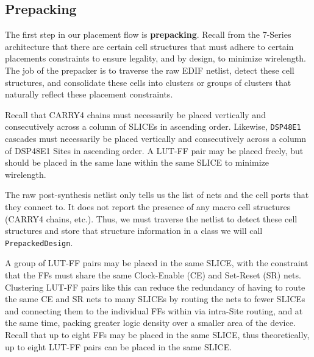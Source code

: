 \documentclass{article}
\begin{document}
    \begin{multicols}{2}

    \subsection{Prepacking}
        \label{subsec:prepacking}


        The first step in our placement flow is \textbf{prepacking}. 
        Recall from the 7-Series architecture that there are certain cell structures that must adhere to certain placements constraints to ensure legality, and by design, to minimize wirelength. 
        The job of the prepacker is to traverse the raw EDIF netlist, detect these cell structures, and consolidate these cells into clusters or groups of clusters that naturally reflect these placement constraints. 

        Recall that CARRY4 chains must necessarily be placed vertically and consecutively across a column of SLICEs in ascending order. 
        Likewise, \texttt{DSP48E1} cascades must necessarily be placed vertically and consecutively across a column of DSP48E1 Sites in ascending order. 
        A LUT-FF pair may be placed freely, but should be placed in the same lane within the same SLICE to minimize wirelength.

        The raw post-synthesis netlist only tells us the list of nets and the cell ports that they connect to. 
        It does not report the presence of any macro cell structures (CARRY4 chains, etc.). 
        Thus, we must traverse the netlist to detect these cell structures and store that structure information in a class we will call \texttt{PrepackedDesign}.

        A group of LUT-FF pairs may be placed in the same SLICE, with the constraint that the FFs must share the same Clock-Enable (CE) and Set-Reset (SR) nets.
        Clustering LUT-FF pairs like this can reduce the redundancy of having to route the same CE and SR nets to many SLICEs by routing the nets to fewer SLICEs and connecting them to the individual FFs within via intra-Site routing, and at the same time, packing greater logic density over a smaller area of the device. 
        Recall that up to eight FFs may be placed in the same SLICE, thus theoretically, up to eight LUT-FF pairs can be placed in the same SLICE. 



\end{multicols}
\end{document}
